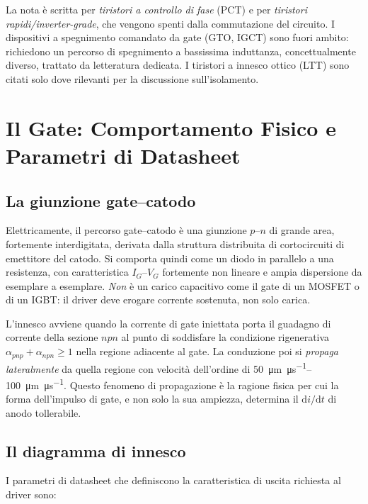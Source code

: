 \documentclass[11pt,a4paper]{article}
\begin{document}
La nota è scritta per \emph{tiristori a controllo di fase} (PCT) e per
\emph{tiristori rapidi/inverter-grade}, che vengono spenti dalla commutazione del
circuito. I dispositivi a spegnimento comandato da gate (GTO, IGCT) sono fuori
ambito: richiedono un percorso di spegnimento a bassissima induttanza,
concettualmente diverso, trattato da letteratura dedicata. I tiristori a innesco
ottico (LTT) sono citati solo dove rilevanti per la discussione sull'isolamento.

\section{Il Gate: Comportamento Fisico e Parametri di Datasheet}

\subsection{La giunzione gate--catodo}

Elettricamente, il percorso gate--catodo è una giunzione $p$--$n$ di grande area,
fortemente interdigitata, derivata dalla struttura distribuita di cortocircuiti di
emettitore del catodo. Si comporta quindi come un diodo in parallelo a una
resistenza, con caratteristica $I_G$--$V_G$ fortemente non lineare e ampia
dispersione da esemplare a esemplare. \emph{Non} è un carico capacitivo come il
gate di un MOSFET o di un IGBT: il driver deve erogare corrente sostenuta, non solo
carica.

L'innesco avviene quando la corrente di gate iniettata porta il guadagno di corrente
della sezione $npn$ al punto di soddisfare la condizione rigenerativa
$\alpha_{pnp}+\alpha_{npn}\ge 1$ nella regione adiacente al gate. La conduzione poi
si \emph{propaga lateralmente} da quella regione con velocità dell'ordine di
\SIrange{50}{100}{\micro\metre\per\micro\second}. Questo fenomeno di propagazione è
la ragione fisica per cui la forma dell'impulso di gate, e non solo la sua ampiezza,
determina il $\mathrm{d}i/\mathrm{d}t$ di anodo tollerabile.

\subsection{Il diagramma di innesco}

I parametri di datasheet che definiscono la caratteristica di uscita richiesta al
driver sono:
\end{document}
